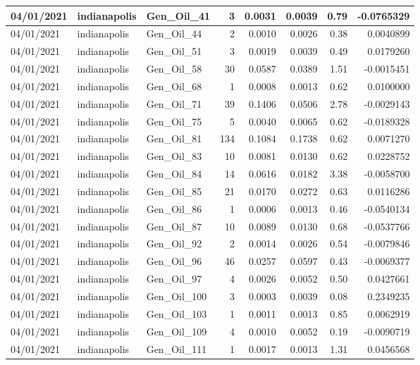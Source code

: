 \documentclass[
  letterpaper,
  DIV=11,
  numbers=noendperiod]{scrartcl}
\begin{document}
\begin{tabular}{l|l|l|r|r|r|r|r}
\hline
04/01/2021 & indianapolis & Gen\_Oil\_41 & 3 & 0.0031 & 0.0039 & 0.79 & -0.0765329\\
\hline
04/01/2021 & indianapolis & Gen\_Oil\_44 & 2 & 0.0010 & 0.0026 & 0.38 & 0.0040899\\
\hline
04/01/2021 & indianapolis & Gen\_Oil\_51 & 3 & 0.0019 & 0.0039 & 0.49 & 0.0179260\\
\hline
04/01/2021 & indianapolis & Gen\_Oil\_58 & 30 & 0.0587 & 0.0389 & 1.51 & -0.0015451\\
\hline
04/01/2021 & indianapolis & Gen\_Oil\_68 & 1 & 0.0008 & 0.0013 & 0.62 & 0.0100000\\
\hline
04/01/2021 & indianapolis & Gen\_Oil\_71 & 39 & 0.1406 & 0.0506 & 2.78 & -0.0029143\\
\hline
04/01/2021 & indianapolis & Gen\_Oil\_75 & 5 & 0.0040 & 0.0065 & 0.62 & -0.0189328\\
\hline
04/01/2021 & indianapolis & Gen\_Oil\_81 & 134 & 0.1084 & 0.1738 & 0.62 & 0.0071270\\
\hline
04/01/2021 & indianapolis & Gen\_Oil\_83 & 10 & 0.0081 & 0.0130 & 0.62 & 0.0228752\\
\hline
04/01/2021 & indianapolis & Gen\_Oil\_84 & 14 & 0.0616 & 0.0182 & 3.38 & -0.0058700\\
\hline
04/01/2021 & indianapolis & Gen\_Oil\_85 & 21 & 0.0170 & 0.0272 & 0.63 & 0.0116286\\
\hline
04/01/2021 & indianapolis & Gen\_Oil\_86 & 1 & 0.0006 & 0.0013 & 0.46 & -0.0540134\\
\hline
04/01/2021 & indianapolis & Gen\_Oil\_87 & 10 & 0.0089 & 0.0130 & 0.68 & -0.0537766\\
\hline
04/01/2021 & indianapolis & Gen\_Oil\_92 & 2 & 0.0014 & 0.0026 & 0.54 & -0.0079846\\
\hline
04/01/2021 & indianapolis & Gen\_Oil\_96 & 46 & 0.0257 & 0.0597 & 0.43 & -0.0069377\\
\hline
04/01/2021 & indianapolis & Gen\_Oil\_97 & 4 & 0.0026 & 0.0052 & 0.50 & 0.0427661\\
\hline
04/01/2021 & indianapolis & Gen\_Oil\_100 & 3 & 0.0003 & 0.0039 & 0.08 & 0.2349235\\
\hline
04/01/2021 & indianapolis & Gen\_Oil\_103 & 1 & 0.0011 & 0.0013 & 0.85 & 0.0062919\\
\hline
04/01/2021 & indianapolis & Gen\_Oil\_109 & 4 & 0.0010 & 0.0052 & 0.19 & -0.0090719\\
\hline
04/01/2021 & indianapolis & Gen\_Oil\_111 & 1 & 0.0017 & 0.0013 & 1.31 & 0.0456568\\

\end{tabular}
\end{document}
